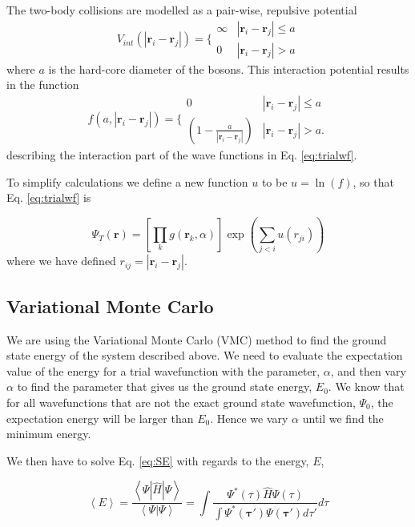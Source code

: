 The two-body collisions are modelled as a pair-wise, repulsive potential 
 \begin{equation}
 V_{int}(|\mathbf{r}_i-\mathbf{r}_j|) =  \Bigg\{
 \begin{array}{ll}
	 \infty & {|\mathbf{r}_i-\mathbf{r}_j|} \leq {a}\\
	 0 & {|\mathbf{r}_i-\mathbf{r}_j|} > {a}
 \end{array}
 \end{equation}
where $a$ is the hard-core diameter of the bosons. This interaction potential results in the function
 \begin{equation}\label{eq:interaction_term}
    f(a,|\mathbf{r}_i-\mathbf{r}_j|)=\Bigg\{
 \begin{array}{ll}
	 0 & {|\mathbf{r}_i-\mathbf{r}_j|} \leq {a}\\
	 (1-\frac{a}{|\mathbf{r}_i-\mathbf{r}_j|}) & {|\mathbf{r}_i-\mathbf{r}_j|} > {a}.
 \end{array}
 \end{equation}
 describing the interaction part of the wave functions in Eq. \ref{eq:trialwf}.
 
 To simplify calculations we define a new function $u$ to be $u = \ln(f)$, so that Eq. \ref{eq:trialwf} is 
 
 \begin{equation*}
\Psi_T(\mathbf{r})=\left[
    \prod_k g(\mathbf{r}_k, \alpha)
\right]
\exp{\left(\sum_{j<i}u(r_{ji})\right)}
\end{equation*}
where we have defined $r_{ij}=|\mathbf{r}_i-\mathbf{r}_j|$.
 

\subsection{Variational Monte Carlo}

We are using the Variational Monte Carlo (VMC) method to find the ground state energy of the system described above. We need to evaluate the expectation value of the energy for a trial wavefunction with the parameter, $\alpha$, and then vary $\alpha$ to find the parameter that gives us the ground state energy, $E_0$. We know that for all wavefunctions that are not the exact ground state wavefunction, $\Psi_0$, the expectation energy will be larger than $E_0$. Hence we vary $\alpha$ until we find the minimum energy.

We then have to solve Eq. \ref{eq:SE} with regards to the energy, $E$, 

\begin{equation}\label{eq:expec_value}
\left< E \right> = \frac{\left< \Psi | \hat{H}| \Psi \right>}{\left< \Psi | \Psi \right>} = \int \frac{\Psi^*(\tau) \hat{H} \Psi(\tau)}{\int \Psi^*(\mathbf{\tau}')\Psi(\mathbf{\tau}') d \tau' }d\tau 
\end{equation}

